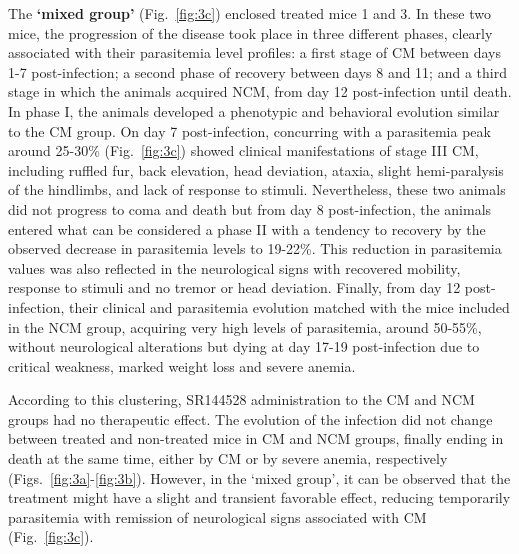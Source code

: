 \documentclass[empirical, authordate, issue]{jote-new-article}
\begin{document}
The \textbf{`mixed group' }(Fig.~\ref{fig:3c}) enclosed treated mice 1 and 3. In these two mice, the progression of the disease took place in three different phases, clearly associated with their parasitemia level profiles: a first stage of CM between days 1-7 post-infection; a second phase of recovery between days 8 and 11; and a third stage in which the animals acquired NCM, from day 12 post-infection until death. In phase I, the animals developed a phenotypic and behavioral evolution similar to the CM group. On day 7 post-infection, concurring with a parasitemia peak around 25-30\% (Fig.~\ref{fig:3c}) showed clinical manifestations of stage III CM, including ruffled fur, back elevation, head deviation, ataxia, slight hemi-paralysis of the hindlimbs, and lack of response to stimuli. Nevertheless, these two animals did not progress to coma and death but from day 8 post-infection, the animals entered what can be considered a phase II with a tendency to recovery by the observed decrease in parasitemia levels to 19-22\%. This reduction in parasitemia values was also reflected in the neurological signs with recovered mobility, response to stimuli and no tremor or head deviation. Finally, from day 12 post-infection, their clinical and parasitemia evolution matched with the mice included in the NCM group, acquiring very high levels of parasitemia, around 50-55\%, without neurological alterations but dying at day 17-19 post-infection due to critical weakness, marked weight loss and severe anemia.


According to this clustering, SR144528 administration to the CM and NCM groups had no therapeutic effect. The evolution of the infection did not change between treated and non-treated mice in CM and NCM groups, finally ending in death at the same time, either by CM or by severe anemia, respectively (Figs.~\ref{fig:3a}-\ref{fig:3b}). However, in the `mixed group', it can be observed that the treatment might have a slight and transient favorable effect, reducing temporarily parasitemia with remission of neurological signs associated with CM (Fig.~\ref{fig:3c}).
\end{document}
